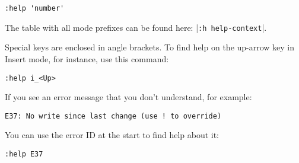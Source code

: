  \begin{Verbatim}[samepage=true]
 :help 'number'
 \end{Verbatim}

The table with all mode prefixes can be found here: |\texttt{:h help-context}|.

Special keys are enclosed in angle brackets.
To find help on the up-arrow key in Insert mode, for instance, use this command:

 \begin{Verbatim}[samepage=true]
 :help i_<Up>
 \end{Verbatim}

If you see an error message that you don't understand, for example:

	\begin{Verbatim}[samepage=true]
  E37: No write since last change (use ! to override)
	\end{Verbatim}

You can use the error ID at the start to find help about it:

 \begin{Verbatim}[samepage=true]
 :help E37
 \end{Verbatim}

